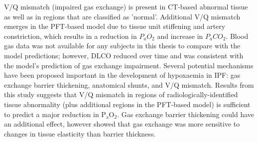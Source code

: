 V/Q mismatch (impaired gas exchange) is present in CT-based abnormal tissue as well as in regions that are classified as 'normal'. Additional V/Q mismatch emerges in the PFT-based model due to tissue unit stiffening and artery constriction, which results in a reduction in $P_aO_2$ and increase in $P_aCO_2$. Blood gas data was not available for any subjects in this thesis to compare with the model predictions; however, DLCO reduced over time and was consistent with the model's prediction of gas exchange impairment. Several potential mechanisms have been proposed important in the development of hypoxaemia in IPF: gas exchange barrier thickening, anatomical shunts, and V/Q mismatch. Results from this study suggests that V/Q mismatch in regions of radiologically-identified tissue abnormality (plus additional regions in the PFT-based model) is sufficient to predict a major reduction in $\mathrm{P_aO_2}$. Gas exchange barrier thickening could have an additional effect, however \cite{swan2010multi} showed that gas exchange was more sensitive to changes in tissue elasticity than barrier thickness.

